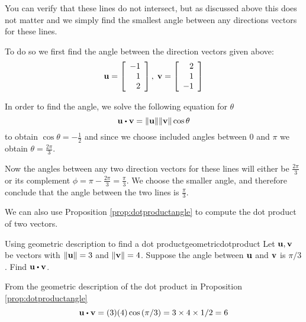\begin{solution}
You can verify that these lines do not intersect, but as discussed
above this does not matter and we simply find the smallest angle
between any directions vectors for these lines.

To do so  we first find the angle
between the direction vectors given above:
\begin{equation*}
{\bf u}=\left[
\begin{array}{r}
-1 \\
1 \\
2
\end{array}
\right],\;
{\bf v}=\left[
\begin{array}{r}
2 \\
1 \\
-1
\end{array}
\right]
\end{equation*}

In order to find the angle, we solve the following equation for $\theta$
\begin{equation*}
\vect{u}\dotprod \vect{v}=\vectlength \vect{u}\vectlength \vectlength \vect{v}
\vectlength \cos \theta
\end{equation*}
to obtain $\cos \theta = -\frac{1}{2}$ and since we choose included
angles between $0$ and $\pi$ we obtain $\theta = \frac{2 \pi}{3}$.


Now the angles between any two direction vectors for these lines will
either be $\frac{2 \pi}{3}$ or its complement $ \phi = \pi -  \frac{2 \pi}{3}
= \frac{\pi}{3}$. We choose the smaller angle, and therefore conclude that the angle between the two lines is $\frac{\pi}{3}$.
\end{solution}

We can also use Proposition \ref{prop:dotproductangle} to compute the dot product of two vectors.

\begin{example}{Using geometric description to find a dot product}{geometricdotproduct}
Let ${\bf u},{\bf v}$ be vectors with $ \| {\bf u} \| = 3$ and $\| {\bf v} \| = 4$. 
Suppose the angle between ${\bf u}$ and ${\bf v}$ is $\pi / 3$. Find $\vect{u}\dotprod \vect{v}$.
\end{example}

\begin{solution}
From the geometric description of the dot product in Proposition \ref{prop:dotproductangle}
\begin{equation*}
\vect{u}\dotprod \vect{v}=(3)(4) \cos \left( \pi / 3\right) =3\times
4\times 1/2=6
\end{equation*}
\end{solution}

